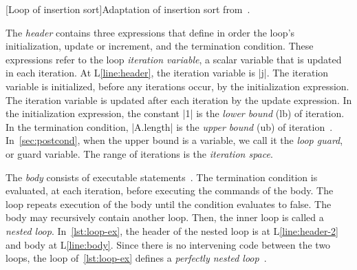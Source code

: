 \begin{center}
\begin{minipage}{\textwidth}
\captionsetup{type=lstlisting}
[Loop of insertion sort]{Adaptation of insertion sort from~\textcite{cormen2009}.}
\label{lst:loop-ex}
\end{minipage}
\end{center}

The \emph{header} contains three expressions that define in order the loop's initialization, update or increment, and the termination condition.
These expressions refer to the loop \emph{iteration variable}, a scalar variable that is updated in each iteration.
At L\ref{line:header}, the iteration variable is \pr|j|.
The iteration variable is initialized, before any iterations occur, by the initialization expression.
The iteration variable is updated after each iteration by the update expression.
In the initialization expression, the constant \pr|1| is the \emph{lower bound} (lb) of iteration.
In the termination condition, \pr|A.length| is the \emph{upper bound} (ub) of iteration~\cite[p. 198--199]{openmp_api}.
In~\autoref{sec:postcond}, when the upper bound is a variable, we call it the \emph{loop guard}, or {guard variable}.
The range of iterations is the \emph{iteration space}.

The \emph{body} consists of executable statements~\cite[p. 67]{openmp_api}.
The termination condition is evaluated, at each iteration, before executing the commands of the body.
The loop repeats execution of the body until the condition evaluates to false.
The body may recursively contain another loop.
Then, the inner loop is called a \emph{nested loop}.
In~\autoref{lst:loop-ex}, the header of the nested loop is at L\ref{line:header-2} and body at L\ref{line:body}.
Since there is no intervening code between the two loops, the loop of~\autoref{lst:loop-ex} defines a \emph{perfectly nested loop}~\cite[p. 84]{openmp_api}.


